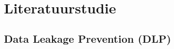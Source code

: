 



\section{Literatuurstudie}%
\label{sec:literatuurstudie}

\subsection{Data Leakage Prevention (DLP)}%

